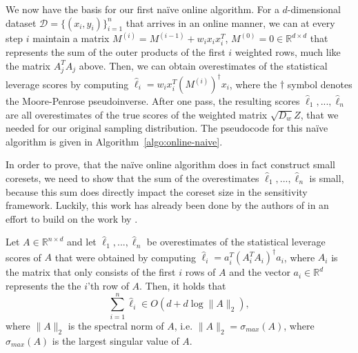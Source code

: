 We now have the basis for our first na\"ive online algorithm.
For a $d$-dimensional dataset
$\mathcal{D} = \{ (x_i, y_i) \}_{i=1}^n$ that arrives in an
online manner, we can at every step $i$ maintain a matrix
$M^{(i)} = M^{(i-1)} + w_i x_i x_i^T$,
$M^{(0)} = 0 \in \mathbb{R}^{d \times d}$ that represents the sum
of the outer products of the first $i$ weighted rows, much like the matrix
$A_j^TA_j$ above. Then, we can obtain overestimates of the statistical
leverage scores by computing $\hat{\ell}_i = w_i x_i^T (M^{(i)})^\dagger x_i$,
where the $\dagger$ symbol denotes the Moore-Penrose pseudoinverse.
After one pass, the resulting scores
$\hat{\ell}_1, ..., \hat{\ell}_n$ are all overestimates of the
true scores of the weighted matrix $\sqrt{D_w}Z$, that we
needed for our original sampling distribution.
The pseudocode for this na\"ive algorithm is given in
Algorithm~\ref{algo:online-naive}.

In order to prove, that the na\"ive online algorithm does in fact
construct small coresets, we need to show that the sum of the
overestimates $\hat{\ell}_1, ..., \hat{\ell}_n$ is small,
because this sum does directly impact the coreset size in the
sensitivity framework.
Luckily, this work has already been done by the authors of
\cite{tensor-factorization} in an effort to build on the work
by \cite{online-row-sampling}.

\begin{lemma}
    \label{lemma:online-scores-sum}
    Let $A \in \mathbb{R}^{n \times d}$ and let
    $\hat{\ell}_1, ..., \hat{\ell}_n$ be overestimates of the statistical
    leverage scores of $A$ that were obtained by computing
    $\hat{\ell}_i = a_i^T (A_i^TA_i)^\dagger a_i$,
    where $A_i$ is the matrix that only consists of the first
    $i$ rows of $A$ and the vector $a_i \in \mathbb{R}^d$ represents the
    the $i$'th row of $A$.
    Then, it holds that
    \begin{equation*}
        \sum_{i=1}^n \hat{\ell}_i \in O(d + d \log \lVert A \rVert_2),
    \end{equation*}
    where $\lVert A \rVert_2$ is the spectral norm of $A$, i.e.
    $\lVert A \rVert_2 = \sigma_{max}(A)$, where $\sigma_{max}(A)$
    is the largest singular value of $A$.

\end{lemma}

